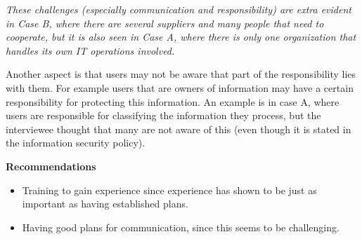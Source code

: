 \textit{These challenges (especially communication and responsibility) are extra evident in Case B, where there are several suppliers and many people that need to cooperate, but it is also seen in Case A, where there is only one organization that handles its own IT operations involved.}

Another aspect is that users may not be aware that part of the responsibility lies with them. For example users that are owners of information may have a certain responsibility for protecting this information. An example is in case A, where users are responsible for classifying the information they process, but the interviewee thought that many are not aware of this (even though it is stated in the information security policy).

\textbf{Recommendations}
\begin{itemize}
\item Training to gain experience since experience has shown to be just as important as having established plans.
\item Having good plans for communication, since this seems to be challenging.
\end{itemize}

